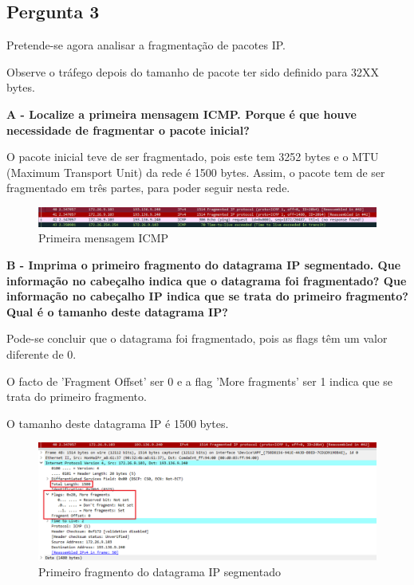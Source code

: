 \documentclass[11pt]{article}
\begin{document}
\clearpage
\subsection{Pergunta 3}

Pretende-se agora analisar a fragmentação de pacotes IP.

Observe o tráfego depois do tamanho de pacote ter sido  definido para 32XX bytes.

\vspace{0.5cm}

\textbf{A - Localize a primeira mensagem ICMP. Porque é que houve necessidade de fragmentar o pacote inicial? }

O pacote inicial teve de ser fragmentado, pois este tem 3252 bytes e o MTU (Maximum Transport Unit) da rede é 1500 bytes. Assim, o pacote tem de ser fragmentado em três partes, para poder seguir nesta rede.

\begin{figure}[hbt!]
    \centering
    \includegraphics[width=\textwidth]{images/parte1/3252/primeiro_icmp.png}
    \caption{Primeira mensagem ICMP}
\end{figure}

\vspace{0.5cm}

\textbf{B - Imprima o primeiro fragmento do datagrama IP segmentado. Que informação no cabeçalho indica que o datagrama foi fragmentado? Que informação no cabeçalho IP indica que se trata do primeiro fragmento? Qual é o tamanho deste datagrama IP?}

Pode-se concluir que o datagrama foi fragmentado, pois as flags têm um valor diferente de 0.

O facto de 'Fragment Offset' ser 0 e a flag 'More fragments' ser 1 indica que se trata do primeiro fragmento.

O tamanho deste datagrama IP é 1500 bytes.

\begin{figure}[hbt!]
    \centering
    \includegraphics[width=\textwidth]{images/parte1/3252/primeiro_fragmento.png}
    \caption{Primeiro fragmento do datagrama IP segmentado}
\end{figure}
\end{document}
